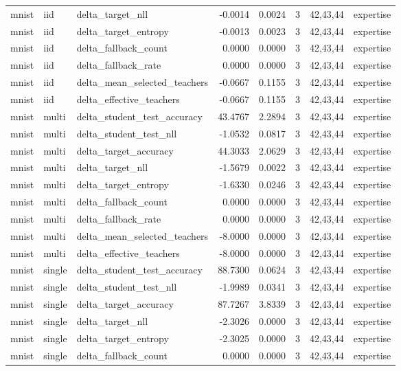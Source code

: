 \begin{tabular}{lllrrrll}
mnist & iid & delta\_target\_nll & -0.0014 & 0.0024 & 3 & 42,43,44 & expertise \\
mnist & iid & delta\_target\_entropy & -0.0013 & 0.0023 & 3 & 42,43,44 & expertise \\
mnist & iid & delta\_fallback\_count & 0.0000 & 0.0000 & 3 & 42,43,44 & expertise \\
mnist & iid & delta\_fallback\_rate & 0.0000 & 0.0000 & 3 & 42,43,44 & expertise \\
mnist & iid & delta\_mean\_selected\_teachers & -0.0667 & 0.1155 & 3 & 42,43,44 & expertise \\
mnist & iid & delta\_effective\_teachers & -0.0667 & 0.1155 & 3 & 42,43,44 & expertise \\
mnist & multi & delta\_student\_test\_accuracy & 43.4767 & 2.2894 & 3 & 42,43,44 & expertise \\
mnist & multi & delta\_student\_test\_nll & -1.0532 & 0.0817 & 3 & 42,43,44 & expertise \\
mnist & multi & delta\_target\_accuracy & 44.3033 & 2.0629 & 3 & 42,43,44 & expertise \\
mnist & multi & delta\_target\_nll & -1.5679 & 0.0022 & 3 & 42,43,44 & expertise \\
mnist & multi & delta\_target\_entropy & -1.6330 & 0.0246 & 3 & 42,43,44 & expertise \\
mnist & multi & delta\_fallback\_count & 0.0000 & 0.0000 & 3 & 42,43,44 & expertise \\
mnist & multi & delta\_fallback\_rate & 0.0000 & 0.0000 & 3 & 42,43,44 & expertise \\
mnist & multi & delta\_mean\_selected\_teachers & -8.0000 & 0.0000 & 3 & 42,43,44 & expertise \\
mnist & multi & delta\_effective\_teachers & -8.0000 & 0.0000 & 3 & 42,43,44 & expertise \\
mnist & single & delta\_student\_test\_accuracy & 88.7300 & 0.0624 & 3 & 42,43,44 & expertise \\
mnist & single & delta\_student\_test\_nll & -1.9989 & 0.0341 & 3 & 42,43,44 & expertise \\
mnist & single & delta\_target\_accuracy & 87.7267 & 3.8339 & 3 & 42,43,44 & expertise \\
mnist & single & delta\_target\_nll & -2.3026 & 0.0000 & 3 & 42,43,44 & expertise \\
mnist & single & delta\_target\_entropy & -2.3025 & 0.0000 & 3 & 42,43,44 & expertise \\
mnist & single & delta\_fallback\_count & 0.0000 & 0.0000 & 3 & 42,43,44 & expertise \\

\end{tabular}
